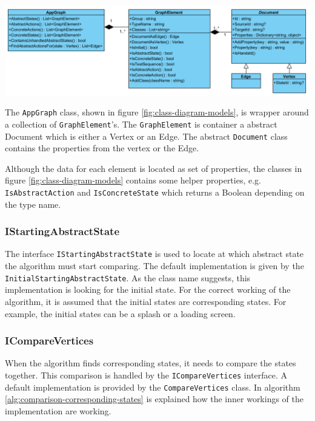 \begingroup
\captionsetup{type=figure}
\includegraphics[scale=0.6]{images/4-UML-Models.png}
\label{fig:class-diagram-models}
\endgroup

The \verb|AppGraph| class, shown in figure \ref{fig:class-diagram-models}, is wrapper around a collection of \verb|GraphElement|'s. The \verb|GraphElement| is container a abstract Document which is either a Vertex or an Edge. The abstract \verb|Document| class contains the properties from the vertex or the Edge.


Although the data for each element is located as set of properties, the classes in figure \ref{fig:class-diagram-models} contains some helper properties, e.g. \verb|IsAbstractAction| and \verb|IsConcreteState| which returns a Boolean depending on the type name. 

\subsubsection{IStartingAbstractState} \label{sec:starting-abstract-state}
The interface \verb|IStartingAbstractState| is used to locate at which abstract state the algorithm must start comparing. The default implementation is given by the \verb|InitialStartingAbstractState|. As the class name suggests, this implementation is looking for the initial state. For the correct working of the algorithm, it is assumed that the initial states are corresponding states. For example, the initial states can be a splash or a loading screen.

\subsubsection{ICompareVertices} \label{sec:i-compare-vertices}
When the algorithm finds corresponding states, it needs to compare the states together. This comparison is handled by the \verb|ICompareVertices| interface. A default implementation is provided by the \verb|CompareVertices| class. In algorithm \ref{alg:comparison-corresponding-states} is explained how the inner workings of the implementation are working.  

